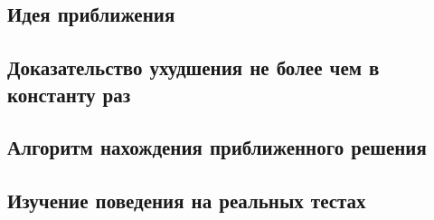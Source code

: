 \subsection{Идея приближения}

\subsection{Доказательство ухудшения не более чем в константу раз}

\subsection{Алгоритм нахождения приближенного решения}

\subsection{Изучение поведения на реальных тестах}